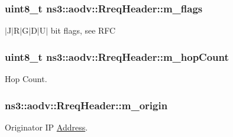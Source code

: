\subsubsection[{\texorpdfstring{m\+\_\+flags}{m_flags}}]{\setlength{\rightskip}{0pt plus 5cm}uint8\+\_\+t ns3\+::aodv\+::\+Rreq\+Header\+::m\+\_\+flags\hspace{0.3cm}{\ttfamily [private]}}\hypertarget{classns3_1_1aodv_1_1RreqHeader_af0551e8fbcf652fdb6a4e917e45f6e3b}{}\label{classns3_1_1aodv_1_1RreqHeader_af0551e8fbcf652fdb6a4e917e45f6e3b}


$\vert$\+J$\vert$\+R$\vert$\+G$\vert$\+D$\vert$\+U$\vert$ bit flags, see R\+FC 

\subsubsection[{\texorpdfstring{m\+\_\+hop\+Count}{m_hopCount}}]{\setlength{\rightskip}{0pt plus 5cm}uint8\+\_\+t ns3\+::aodv\+::\+Rreq\+Header\+::m\+\_\+hop\+Count\hspace{0.3cm}{\ttfamily [private]}}\hypertarget{classns3_1_1aodv_1_1RreqHeader_a413c149d362a3cb3756cb9cbf319e036}{}\label{classns3_1_1aodv_1_1RreqHeader_a413c149d362a3cb3756cb9cbf319e036}


Hop Count. 

\subsubsection[{\texorpdfstring{m\+\_\+origin}{m_origin}}]{ ns3\+::aodv\+::\+Rreq\+Header\+::m\+\_\+origin\hspace{0.3cm}{\ttfamily [private]}}\hypertarget{classns3_1_1aodv_1_1RreqHeader_a64d3aa3822002c516f26fc76a59e1838}{}\label{classns3_1_1aodv_1_1RreqHeader_a64d3aa3822002c516f26fc76a59e1838}


Originator IP \hyperlink{classns3_1_1Address}{Address}. 

